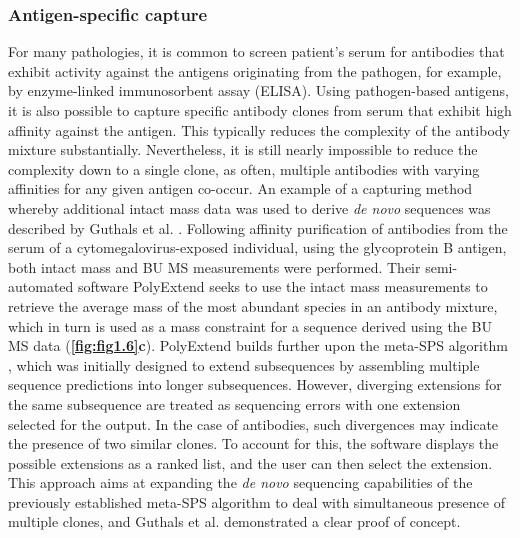 \subsubsection{Antigen-specific capture}
For many pathologies, it is common to screen patient’s serum for antibodies that exhibit activity against the antigens originating from the pathogen, for example, by enzyme-linked immunosorbent assay (ELISA). Using pathogen-based antigens, it is also possible to capture specific antibody clones from serum that exhibit high affinity against the antigen. This typically reduces the complexity of the antibody mixture substantially. Nevertheless, it is still nearly impossible to reduce the complexity down to a single clone, as often, multiple antibodies with varying affinities for any given antigen co-occur. An example of a capturing method whereby additional intact mass data was used to derive \emph{de novo} sequences was described by Guthals et al. \cite{guthals2017de}. Following affinity purification of antibodies from the serum of a cytomegalovirus-exposed individual, using the glycoprotein B antigen, both intact mass and BU MS measurements were performed. Their semi-automated software PolyExtend seeks to use the intact mass measurements to retrieve the average mass of the most abundant species in an antibody mixture, which in turn is used as a mass constraint for a sequence derived using the BU MS data (\textbf{\autoref{fig:fig1.6}c}). PolyExtend builds further upon the meta-SPS algorithm \cite{guthals2012shotgun}, which was initially designed to extend subsequences by assembling multiple sequence predictions into longer subsequences. However, diverging extensions for the same subsequence are treated as sequencing errors with one extension selected for the output. In the case of antibodies, such divergences may indicate the presence of two similar clones. To account for this, the software displays the possible extensions as a ranked list, and the user can then select the extension. This approach aims at expanding the \emph{de novo} sequencing capabilities of the previously established meta-SPS algorithm to deal with simultaneous presence of multiple clones, and Guthals et al. \cite{guthals2017de} demonstrated a clear proof of concept.

